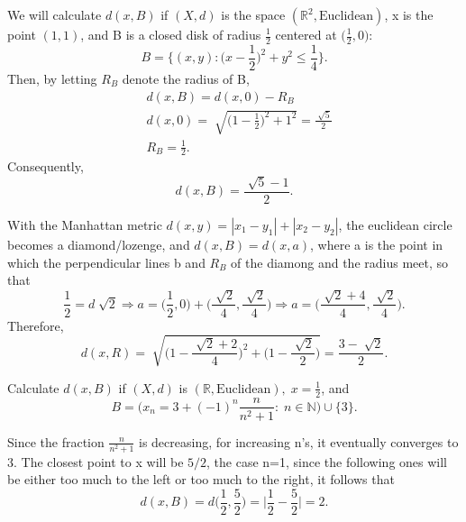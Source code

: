 \documentclass[../fractals_everywhere.tex]{subfiles}
\begin{document}
\begin{exr}
	We will calculate \(d(x, B)\) if \((X, d)\) is the space \((\mathbb{R}^{2}, \mathrm{Euclidean})\), x is the point \((1, 1)\), and B is a closed disk of radius \(\frac{1}{2}\) centered at \(\biggl(\frac{1}{2}, 0\biggr)\):
	\[
		B = \biggl\{(x, y): \biggl(x-\frac{1}{2}\biggr)^{2} + y^{2} \leq \frac{1}{4}\biggr\}.
	\]
	Then, by letting \(R_{B}\) denote the radius of B,
	\begin{align*}
		 & d(x, B) = d(x, 0) - R_{B}                                                         \\
		 & d(x, 0) = \sqrt[]{\biggl(1-\frac{1}{2}\biggr)^{2} + 1^{2}} = \frac{\sqrt[]{5}}{2} \\
		 & R_{B} = \frac{1}{2}.
	\end{align*}
	Consequently,
	\[
		d(x, B) = \frac{\sqrt[]{5}-1}{2}.
	\]

	With the Manhattan metric \(d(x, y) = | x_1 - y_1 | + | x_2 - y_2 |\), the euclidean circle becomes a diamond/lozenge, and \(d(x, B) = d(x, a)\), where a is the point in which the perpendicular lines b and \(R_{B}\) of the diamong and the radius meet, so that
	\[
		\frac{1}{2} = d \sqrt[]{2} \Rightarrow a = \biggl(\frac{1}{2}, 0\biggr) + \biggl(\frac{\sqrt[]{2}}{4}, \frac{\sqrt[]{2}}{4}\biggr) \Rightarrow a = \biggl(\frac{\sqrt[]{2}+4}{4}, \frac{\sqrt[]{2}}{4}\biggr).
	\]
	Therefore,
	\[
		d(x, R) = \sqrt[]{\biggl(1-\frac{\sqrt[]{2}+2}{4}\biggr)^{2} + \biggl(1-\frac{\sqrt[]{2}}{2}\biggr)} = \frac{3-\sqrt[]{2}}{2}.
	\]
\end{exr}

\begin{exr}
	Calculate \(d(x, B)\) if \((X, d)\) is \((\mathbb{R}, \mathrm{Euclidean}),\; x = \frac{1}{2}\), and
	\[
		B = \biggl(x_{n} = 3 + (-1)^{n}\frac{n}{n^{2}+1}:\; n\in \mathbb{N}\biggr)\cup \{3\}.
	\]

	Since the fraction \(\displaystyle \frac{n}{n^{2}+1}\) is decreasing, for increasing n's, it eventually converges to 3. The closest point to x will be \(5/2\), the case n=1, since the following ones will be either too much to the left or too much to the right, it follows that
	\[
		d(x, B) = d\biggl(\frac{1}{2}, \frac{5}{2}\biggr) = \biggl\vert \frac{1}{2} - \frac{5}{2} \biggr\vert = 2.
	\]
\end{exr}
\end{document}
